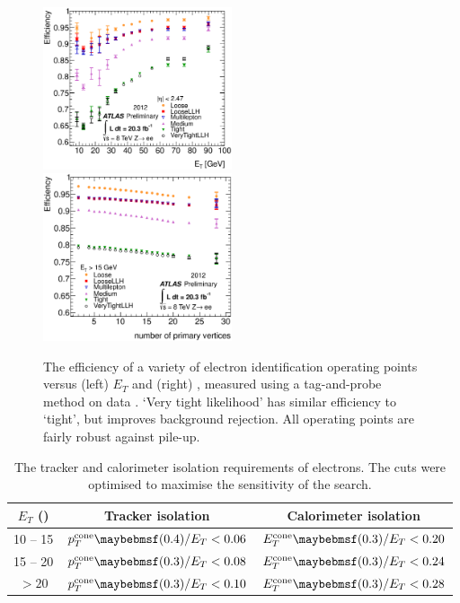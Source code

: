 \begin{figure}
	\includegraphics[width=0.495\textwidth]{tex/selection/el_ideff_et}
	\hfill
	\includegraphics[width=0.495\textwidth]{tex/selection/el_ideff_npv}
	\caption{The efficiency of a variety of electron identification operating points 
	versus (left) $E_T$ and (right) \npv, measured using a tag-and-probe method on 
	\HepProcess{\PZ \HepTo \Pe\Pe} data \cite{ElectronPerf:2012}. `Very tight likelihood' 
	has similar efficiency to `tight', but improves background rejection. All operating 
	points are fairly robust against pile-up.}
	\label{fig:objects:el_ideff}
\end{figure}

\begin{table}[h]
	\begin{tabular}{c@{\hskip 0.3in}c@{\hskip 0.3in}c}
		$E_T$ (\GeV) & Tracker isolation & Calorimeter isolation \\
		\hline
		10 -- 15 & $p_T^{\text{cone}}\parenths{0.4}/E_T < 0.06$ & $E_T^{\text{cone}}\parenths{0.3}/E_T < 0.20$ \\
		15 -- 20 & $p_T^{\text{cone}}\parenths{0.3}/E_T < 0.08$ & $E_T^{\text{cone}}\parenths{0.3}/E_T < 0.24$ \\
		$> 20$   & $p_T^{\text{cone}}\parenths{0.3}/E_T < 0.10$ & $E_T^{\text{cone}}\parenths{0.3}/E_T < 0.28$ \\
	\end{tabular}
	\caption{The tracker and calorimeter isolation requirements of electrons. The cuts 
	were optimised to maximise the sensitivity of the \HWWlvlv search.}
	\label{tab:objects:el_iso}
\end{table}

